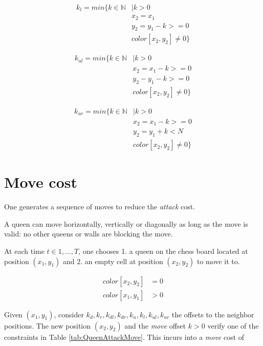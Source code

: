 \documentclass{article} %
\begin{document}
  \begin{align*}
    k_l = min \{ k \in \mathbb{N} & | k > 0 \\
                                  &   x_2 = x_1 \\
                                  &   y_2 = y_1-k >= 0 \\
                                  &   color[x_2, y_2] \ne 0 \}
  \end{align*}

  \begin{align*}
    k_{ul} = min \{ k \in \mathbb{N} & | k > 0 \\
                                     &   x_2 = x_1-k >= 0 \\
                                     &   y_2 - y_1-k >= 0 \\
                                     &   color[x_2, y_2] \ne 0 \}
  \end{align*}

  \begin{align*}
    k_{ur} = min \{ k \in \mathbb{N} & | k > 0 \\
                                     &   x_2 = x_1-k >= 0 \\
                                     &   y_2 = y_1+k < N \\
                                     &   color[x_2, y_2] \ne 0 \}
  \end{align*}


  \section{Move cost}

  One generates a sequence of moves to reduce the \textit{attack} cost.

  A queen can move horizontally, vertically or diagonally as long as the move is valid: no other queens or walls are blocking the move.
  
  At each time $t \in {1, ..., T}$, one chooses 1. a queen on the chess board located at position $(x_{1}, y_{1})$ and 2. an empty cell at position $(x_{2}, y_{2})$ to move it to.

  \begin{align*}
    color[x_2,y_2] &= 0 \\
    color[x_1,y_1] &> 0
  \end{align*}
  
  Given $(x_1,y_1)$, consider $k_d, k_r, k_{dl}, k_{dr}, k_u, k_l, k_{ul}, k_{ur}$ the offsets to the neighbor positions. The new position $(x_2,y_2)$ and the \textit{move} offset $k>0$ verify one of the constraints in Table \ref{tab:QueenAttackMove}. This incurs into a \textit{move} cost of
\end{document}
